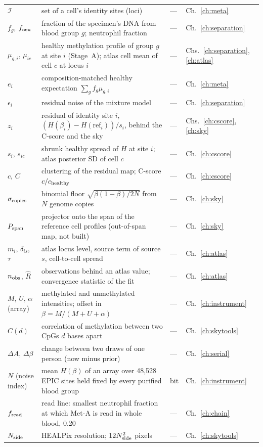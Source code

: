 {\begin{longtable}{@{}>{\raggedright\arraybackslash}p{}>{\raggedright\arraybackslash}p{}>{\raggedright\arraybackslash}p{}>{\raggedright\arraybackslash}p{}@{}}
$\mathcal I$ & set of a cell's identity sites (loci) & --- & Ch.~\ref{ch:meta}\\\iamrowrule
$f_g$, $f_{\rm neu}$ & fraction of the specimen's DNA from blood group $g$; neutrophil fraction & --- & Ch.~\ref{ch:separation}\\\iamrowrule
$\mu_{g,i}$, $\mu_{ic}$ & healthy methylation profile of group $g$ at site $i$ (Stage~A); atlas cell mean of cell $c$ at locus $i$ & --- & Chs.~\ref{ch:separation}, \ref{ch:atlas}\\\iamrowrule
$e_i$ & composition-matched healthy expectation $\sum_gf_g\mu_{g,i}$ & --- & Ch.~\ref{ch:meta}\\\iamrowrule
$\epsilon_i$ & residual noise of the mixture model & --- & Ch.~\ref{ch:separation}\\\iamrowrule
$z_i$ & residual of identity site $i$, $(H(\beta_i)-H(\mathrm{ref}_i))/s_i$, behind the C-score and the sky & --- & Chs.~\ref{ch:cscore}, \ref{ch:sky}\\\iamrowrule
$s_i$, $s_{ic}$ & shrunk healthy spread of $H$ at site $i$; atlas posterior SD of cell $c$ & --- & Ch.~\ref{ch:cscore}\\\iamrowrule
$c$, $C$ & clustering of the residual map; C-score $c/c_{\rm healthy}$ & --- & Ch.~\ref{ch:cscore}\\\iamrowrule
$\sigma_{\rm copies}$ & binomial floor $\sqrt{\beta(1-\beta)/2N}$ from $N$ genome copies & --- & Ch.~\ref{ch:sky}\\\iamrowrule
$P_{\rm span}$ & projector onto the span of the reference cell profiles (out-of-span map, not built) & --- & Ch.~\ref{ch:sky}\\\iamrowrule
$m_i$, $\delta_{is}$, $\tau$ & atlas locus level, source term of source $s$, cell-to-cell spread & --- & Ch.~\ref{ch:atlas}\\\iamrowrule
$n_{\rm obs}$, $\hat R$ & observations behind an atlas value; convergence statistic of the fit & --- & Ch.~\ref{ch:atlas}\\\iamrowrule
$M$, $U$, $\alpha$ (array) & methylated and unmethylated intensities; offset in $\beta=M/(M+U+\alpha)$ & --- & Ch.~\ref{ch:instrument}\\\iamrowrule
$C(d)$ & correlation of methylation between two CpGs $d$ bases apart & --- & Ch.~\ref{ch:skytools}\\\iamrowrule
$\Delta A$, $\Delta\beta$ & change between two draws of one person (now minus prior) & --- & Ch.~\ref{ch:serial}\\\iamrowrule
$N$ (noise index) & mean $H(\beta)$ of an array over 48,528 EPIC sites held fixed by every purified blood group & bit & Ch.~\ref{ch:instrument}\\\iamrowrule
$f_{\rm read}$ & read line: smallest neutrophil fraction at which Met-A is read in whole blood, 0.20 & --- & Ch.~\ref{ch:chain}\\\iamrowrule
$N_{\rm side}$ & HEALPix resolution; $12N_{\rm side}^2$ pixels & --- & Ch.~\ref{ch:skytools}\\
\bottomrule\end{longtable}}
